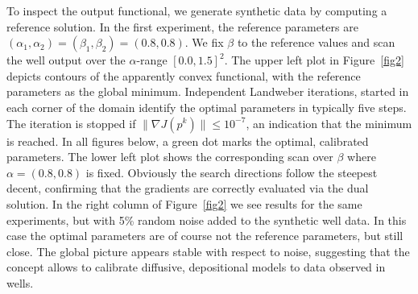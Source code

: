 To inspect the output functional, we generate synthetic data by
computing a reference solution.  In the first experiment, the
reference parameters are
$(\alpha_1, \alpha_2)=(\beta_1, \beta_2)=(0.8,0.8)$.  We fix $\beta$
to the reference values and scan the well output over the
$\alpha$-range $[0.0, 1.5]^2$. The upper left plot in
Figure~\ref{fig2} depicts contours of the apparently convex
functional, with the reference parameters as the global minimum.
Independent Landweber iterations, started in each corner of the domain
identify the optimal parameters in typically five steps.  The
iteration is stopped if $\| \nabla J(p^k) \| \le 10^{-7}$, an
indication that the minimum is reached.  In all figures below, a green
dot marks the optimal, calibrated parameters.  The lower left plot
shows the corresponding scan over $\beta$ where $\alpha=(0.8,0.8)$ is
fixed.  Obviously the search directions follow the steepest decent,
confirming that the gradients are correctly evaluated via the dual
solution.  In the right column of Figure~\ref{fig2} we see results for
the same experiments, but with 5\% random noise added to the synthetic
well data.  In this case the optimal parameters are of course not the
reference parameters, but still close.  The global picture appears
stable with respect to noise, suggesting that the concept allows to
calibrate diffusive, depositional models to data observed in wells.

